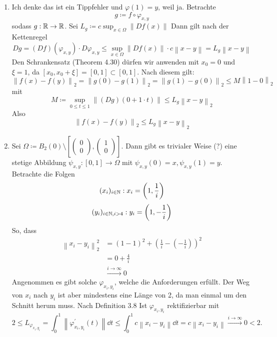 \documentclass[sectionformat=aufgabe]{gadsescript}
\begin{document}
\begin{enumerate}[label=(\alph*)]
	\item Ich denke das ist ein Tippfehler und $ \varphi(1) = y $, weil ja.
		Betrachte
		\[
			g \coloneqq f \circ \varphi_{x, y} 
		\]
		sodass $ g : \mathbb{R} \to \mathbb{R}  $. Sei $ L_g \coloneqq c \sup_{x \in \Omega} \left\| D f(x) \right\|  $
		Dann gilt nach der Kettenregel
		\[
			Dg = (Df)(\varphi_{x, y} ) \cdot D\varphi_{x, y}  \leq \sup_{x \in \Omega} \left\| D f(x) \right\| \cdot c\left\| x - y \right\| = L_g \left\| x - y \right\| 
		\]
		Den Schrankensatz (Theorem 4.30) dürfen wir anwenden mit $ x_0 = 0 $ und $ \xi = 1 $, da $ [x_0, x_0 + \xi] = [0, 1] \subset [0, 1] $.
		Nach diesem gilt:
		\[
			\left\| f(x) - f(y) \right\|_2 = \left\| g(0) - g(1) \right\|_2 = \left\| g(1) - g(0) \right\| _2 \leq M \left\| 1 - 0 \right\| _2
		\]
		mit
		\[
			M \coloneqq \sup_{0 \leq  t \leq 1} \left\| (Dg)(0 + 1 \cdot t) \right\| \leq L_g \left\| x - y \right\| _2
		\]
		Also 
		\[
			\left\| f(x) - f(y) \right\|_2 \leq  L_g \left\| x - y \right\| _2
		\]
	\item Sei $ \Omega \coloneqq B_{2}(0) \setminus \left[ \begin{pmatrix} 0 \\ 0 \end{pmatrix} , \begin{pmatrix} 1 \\ 0 \end{pmatrix}  \right] $.
		Dann gibt es trivialer Weise (?) eine stetige Abbildung $ \psi_{x, y} : [0, 1] \to \Omega $ mit $ \psi_{x, y} (0) = x, \psi_{x, y} (1) = y $.
		Betrachte die Folgen
		\[
			(x_i)_{i \in \mathbb{N} }: x_i = \left( 1, \frac{ 1 }{ i }   \right)
		\]
		\[
			(y_i)_{i \in \mathbb{N}, i > 4 }: y_i = \left( 1, - \frac{ 1 }{ i } \right)
		\]
		So, dass
		\begin{align*}
			\left\| x_i - y_i \right\| _2^2
			&= \left( 1 - 1 \right)^2
			+ \left( \frac{ 1 }{ i } - \left( - \frac{ 1 }{ i }  \right) \right)^2 \\
			&= 0 + \frac{ 4 }{ i } \\
			&\overset{i \to \infty}{\longrightarrow} 0
		\end{align*}
		Angenommen es gibt solche $ \varphi_{x_i, y_i}  $, welche die Anforderungen erfüllt.
		Der Weg von $ x_i $ nach $ y_i $ ist aber mindestens eine Länge von 2, da man einmal um den Schnitt herum muss.
		Nach Definition 3.8 Ist $ \varphi_{x_i, y_i}  $ rektifizierbar mit
		\[
			2 \leq L_{\varphi_{x_i, y_i} } = \int_{0}^{1} \left\| \varphi_{x_i, y_i} ^\prime (t) \right\| \dd t \leq \int_{0}^{1} c \left\| x_i - y_i \right\| \dd t = c \left\| x_i - y_i \right\| \overset{i \to \infty}{\longrightarrow} 0  < 2.
\]
\end{enumerate}
\end{document}
